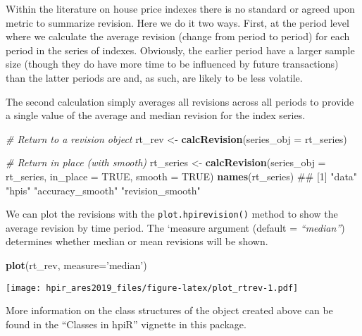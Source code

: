 \documentclass[]{article}
\newenvironment{Shaded}{\begin{snugshade}}{\end{snugshade}}
\newcommand{\CommentTok}[1]{\textcolor[rgb]{0.56,0.35,0.01}{\textit{#1}}}
\newcommand{\DataTypeTok}[1]{\textcolor[rgb]{0.13,0.29,0.53}{#1}}
\newcommand{\KeywordTok}[1]{\textcolor[rgb]{0.13,0.29,0.53}{\textbf{#1}}}
\newcommand{\NormalTok}[1]{#1}
\newcommand{\OtherTok}[1]{\textcolor[rgb]{0.56,0.35,0.01}{#1}}
\newcommand{\StringTok}[1]{\textcolor[rgb]{0.31,0.60,0.02}{#1}}
\begin{document}
Within the literature on house price indexes there is no standard or
agreed upon metric to summarize revision. Here we do it two ways. First,
at the period level where we calculate the average revision (change from
period to period) for each period in the series of indexes. Obviously,
the earlier period have a larger sample size (though they do have more
time to be influenced by future transactions) than the latter periods
are and, as such, are likely to be less volatile.

The second calculation simply averages all revisions across all periods
to provide a single value of the average and median revision for the
index series.

\begin{Shaded}
\begin{Highlighting}[]

  \CommentTok{# Return to a revision object}
\NormalTok{  rt_rev <-}\StringTok{ }\KeywordTok{calcRevision}\NormalTok{(}\DataTypeTok{series_obj =}\NormalTok{ rt_series)}

  \CommentTok{# Return in place (with smooth)}
\NormalTok{  rt_series <-}\StringTok{ }\KeywordTok{calcRevision}\NormalTok{(}\DataTypeTok{series_obj =}\NormalTok{ rt_series,}
                            \DataTypeTok{in_place =} \OtherTok{TRUE}\NormalTok{,}
                            \DataTypeTok{smooth =} \OtherTok{TRUE}\NormalTok{)}
  \KeywordTok{names}\NormalTok{(rt_series)}
\NormalTok{## [1] "data"            "hpis"            "accuracy_smooth" "revision_smooth"}
\end{Highlighting}
\end{Shaded}

We can plot the revisions with the \texttt{plot.hpirevision()} method to
show the average revision by time period. The `measure argument (default
= \emph{``median''}) determines whether median or mean revisions will be
shown.

\begin{Shaded}
\begin{Highlighting}[]
  \KeywordTok{plot}\NormalTok{(rt_rev, }\DataTypeTok{measure=}\StringTok{'median'}\NormalTok{)}
\end{Highlighting}
\end{Shaded}

\texttt{[image: hpir\_ares2019\_files/figure-latex/plot\_rtrev-1.pdf]}

More information on the class structures of the object created above can
be found in the ``Classes in hpiR'' vignette in this package.
\end{document}
